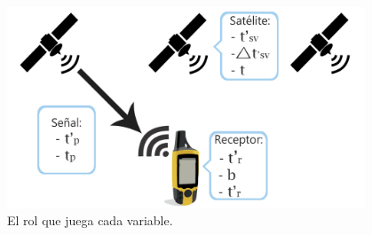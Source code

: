 \begin{figure}[H]
\centering
\includegraphics[width=0.95\textwidth]{Figures/DiagramaMat}
\caption[El rol que juega cada variable.]{El rol que juega cada variable.}
\label{fig:DiagMat}
\end{figure}

